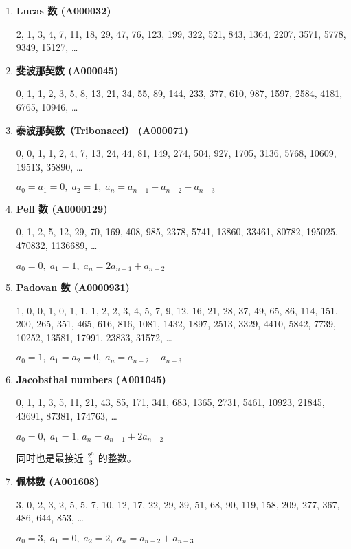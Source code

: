 \documentclass[a4paper, twoside]{article}
\begin{document}
    \begin{enumerate}
    
        \item \textbf{Lucas 数 (A000032)}
        
        2, 1, 3, 4, 7, 11, 18, 29, 47, 76, 123, 199, 322, 521, 843, 1364, 2207, 3571, 5778, 9349, 15127, \dots
        
        \item \textbf{斐波那契数 (A000045)}
        
        0, 1, 1, 2, 3, 5, 8, 13, 21, 34, 55, 89, 144, 233, 377, 610, 987, 1597, 2584, 4181, 6765, 10946, \dots
        
        \item \textbf{泰波那契数（Tribonacci） (A000071)}
        
        0, 0, 1, 1, 2, 4, 7, 13, 24, 44, 81, 149, 274, 504, 927, 1705, 3136, 5768, 10609, 19513, 35890, \dots
        
        $ a_0 = a_1 = 0,\; a_2 = 1,\; a_n = a_{n - 1} + a_{n - 2} + a_{n - 3} $
        
        \item \textbf{Pell 数 (A0000129)}
        
        0, 1, 2, 5, 12, 29, 70, 169, 408, 985, 2378, 5741, 13860, 33461, 80782, 195025, 470832, 1136689, \dots
        
        $ a_0 = 0,\; a_1 = 1,\; a_n = 2a_{n - 1} + a_{n - 2} $
        
        \item \textbf{Padovan 数 (A0000931)}
        
        1, 0, 0, 1, 0, 1, 1, 1, 2, 2, 3, 4, 5, 7, 9, 12, 16, 21, 28, 37, 49, 65, 86, 114, 151, 200, 265, 351, 465, 616, 816, 1081, 1432, 1897, 2513, 3329, 4410, 5842, 7739, 10252, 13581,  17991,   23833, 31572, \dots
        
        $a_0 = 1,\; a_1 = a_2 = 0,\; a_n = a_{n - 2} + a_{n - 3}$
        
        \item \textbf{Jacobsthal numbers (A001045)}
        
        0, 1, 1, 3, 5, 11, 21, 43, 85, 171, 341, 683, 1365, 2731, 5461, 10923, 21845, 43691, 87381, 174763, \dots
        
        $ a_0 = 0,\; a_1 = 1.\; a_n = a_{n - 1} + 2a_{n - 2} $
        
        同时也是最接近 $\frac {2 ^ n} 3$ 的整数。
        
        \item \textbf{佩林数 (A001608)}
        
        3, 0, 2, 3, 2, 5, 5, 7, 10, 12, 17, 22, 29, 39, 51, 68, 90, 119, 158, 209, 277, 367, 486, 644, 853, \dots
        
        $ a_0 = 3,\; a_1 = 0,\; a_2 = 2,\; a_n = a_{n - 2} + a_{n - 3} $
    
    \end{enumerate}
\end{document}
